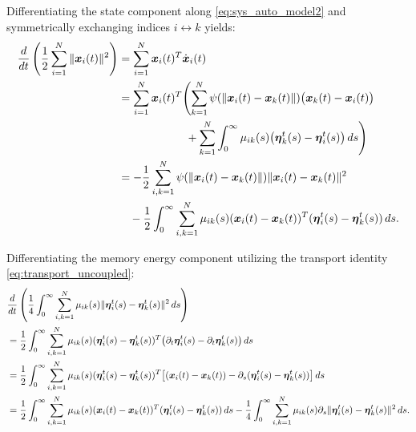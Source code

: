 \documentclass[11pt]{amsart}
\numberwithin{equation}{section}
\begin{document}
Differentiating the state component along \eqref{eq:sys_auto_model2} and symmetrically exchanging indices $i \leftrightarrow k$ yields:
\begin{align}\label{eq:E0_dot_state}
\frac{d}{dt}\left( \frac{1}{2}\sum_{i=1}^N\|\boldsymbol{x}_i(t)\|^2 \right) &= \sum_{i=1}^N \boldsymbol{x}_i(t)^T \dot{\boldsymbol{x}}_i(t) \notag \\
&= \sum_{i=1}^N \boldsymbol{x}_i(t)^T \Biggl( \sum_{k=1}^N \psi(\|\boldsymbol{x}_i(t)-\boldsymbol{x}_k(t)\|)\big(\boldsymbol{x}_k(t) - \boldsymbol{x}_i(t)\big) \notag \\
&\qquad\qquad\qquad + \sum_{k=1}^N\int_0^\infty \mu_{ik}(s)\big(\boldsymbol{\eta}_k^t(s) - \boldsymbol{\eta}_i^t(s)\big)\,ds \Biggr) \notag \\
&= -\frac{1}{2}\sum_{i,k=1}^N \psi(\|\boldsymbol{x}_i(t)-\boldsymbol{x}_k(t)\|)\|\boldsymbol{x}_i(t)-\boldsymbol{x}_k(t)\|^2 \notag \\
&\quad -\frac{1}{2}\int_0^\infty\sum_{i,k=1}^N \mu_{ik}(s)(\boldsymbol{x}_i(t)-\boldsymbol{x}_k(t))^T(\boldsymbol{\eta}_i^t(s)-\boldsymbol{\eta}_k^t(s))\,ds.
\end{align}

Differentiating the memory energy component utilizing the transport identity \eqref{eq:transport_uncoupled}:
{\footnotesize
\begin{align}\label{eq:E0_dot_memory}
&\frac{d}{dt} \left( \frac{1}{4}\int_0^\infty\sum_{i,k=1}^N \mu_{ik}(s)\|\boldsymbol{\eta}_i^t(s)-\boldsymbol{\eta}_k^t(s)\|^2\,ds \right) \notag \\
&= \frac{1}{2}\int_0^\infty\sum_{i,k=1}^N\mu_{ik}(s)(\boldsymbol{\eta}_i^t(s)-\boldsymbol{\eta}_k^t(s))^T\bigl( \partial_t \boldsymbol{\eta}_i^t(s) - \partial_t \boldsymbol{\eta}_k^t(s) \bigr)\,ds \notag \\
&= \frac{1}{2}\int_0^\infty\sum_{i,k=1}^N\mu_{ik}(s)(\boldsymbol{\eta}_i^t(s)-\boldsymbol{\eta}_k^t(s))^T\bigl[ (\boldsymbol{x}_i(t)-\boldsymbol{x}_k(t)) - \partial_s (\boldsymbol{\eta}_i^t(s)-\boldsymbol{\eta}_k^t(s)) \bigr]\,ds \notag \\
&= \frac{1}{2}\int_0^\infty\sum_{i,k=1}^N\mu_{ik}(s)(\boldsymbol{x}_i(t)-\boldsymbol{x}_k(t))^T(\boldsymbol{\eta}_i^t(s)-\boldsymbol{\eta}_k^t(s))\,ds - \frac{1}{4}\int_0^\infty\sum_{i,k=1}^N\mu_{ik}(s)\partial_s\|\boldsymbol{\eta}_i^t(s)-\boldsymbol{\eta}_k^t(s)\|^2\,ds.
\end{align}
}
\end{document}

